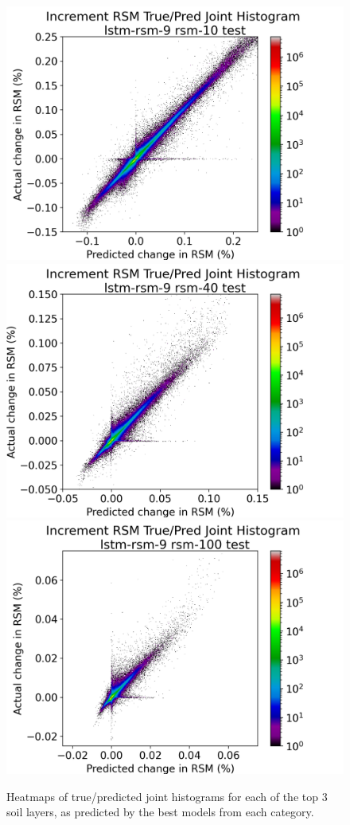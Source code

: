 \begin{figure}[hp!]
    \includegraphics[width=.32\linewidth,draft=false]{figures/validation-curves/eval_test_lstm-rsm-9_rsm-10_hist-true-pred_na.png}
    \includegraphics[width=.32\linewidth,draft=false]{figures/validation-curves/eval_test_lstm-rsm-9_rsm-40_hist-true-pred_na.png}
    \includegraphics[width=.32\linewidth,draft=false]{figures/validation-curves/eval_test_lstm-rsm-9_rsm-100_hist-true-pred_na.png}


    \caption{Heatmaps of true/predicted joint histograms for each of the top 3 soil layers, as predicted by the best models from each category.}
    \label{best-validation}
\end{figure}

